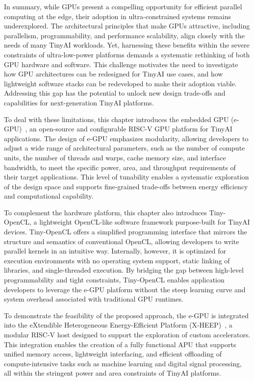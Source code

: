         In summary, while GPUs present a compelling opportunity for efficient parallel computing at the edge, their adoption in ultra-constrained systems remains underexplored. The architectural principles that make GPUs attractive, including parallelism, programmability, and performance scalability, align closely with the needs of many TinyAI workloads. Yet, harnessing these benefits within the severe constraints of ultra-low-power platforms demands a systematic rethinking of both GPU hardware and software. This challenge motivates the need to investigate how GPU architectures can be redesigned for TinyAI use cases, and how lightweight software stacks can be redeveloped to make their adoption viable. Addressing this gap has the potential to unlock new design trade-offs and capabilities for next-generation TinyAI platforms.

        To deal with these limitations, this chapter introduces the embedded GPU (\mbox{e-GPU})~\cite{e-gpu}, an open-source and configurable RISC-V GPU platform for TinyAI applications. The design of \mbox{e-GPU} emphasizes modularity, allowing developers to adjust a wide range of architectural parameters, such as the number of compute units, the number of threads and warps, cache memory size, and interface bandwidth, to meet the specific power, area, and throughput requirements of their target applications. This level of tunability enables a systematic exploration of the design space and supports fine-grained trade-offs between energy efficiency and computational capability.

        To complement the hardware platform, this chapter also introduces \mbox{Tiny-OpenCL}, a lightweight OpenCL-like software framework purpose-built for TinyAI devices. \mbox{Tiny-OpenCL} offers a simplified programming interface that mirrors the structure and semantics of conventional OpenCL, allowing developers to write parallel kernels in an intuitive way. Internally, however, it is optimized for execution environments with no operating system support, static linking of libraries, and single-threaded execution. By bridging the gap between high-level programmability and tight constraints, \mbox{Tiny-OpenCL} enables application developers to leverage the e-GPU platform without the steep learning curve and system overhead associated with traditional GPU runtimes.

        To demonstrate the feasibility of the proposed approach, the \mbox{e-GPU} is integrated into the eXtendible Heterogeneous Energy-Efficient Platform (\mbox{X-HEEP})~\cite{x-heep}, a modular RISC-V host designed to support the exploration of custom accelerators. This integration enables the creation of a fully functional APU that supports unified memory access, lightweight interfacing, and efficient offloading of compute-intensive tasks such as machine learning and digital signal processing, all within the stringent power and area constraints of TinyAI platforms.\\\\
            
